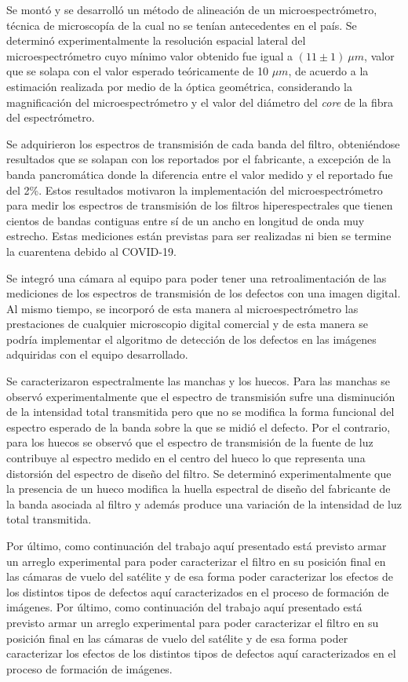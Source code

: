 Se montó y se desarrolló un método de alineación de un microespectrómetro, técnica de microscopía de la cual no se tenían antecedentes en el país. Se determinó experimentalmente la resolución espacial lateral del microespectrómetro cuyo mínimo valor obtenido fue igual a $(11 \pm 1)~\mu m$, valor que se solapa con el valor esperado teóricamente de 10 $\mu m$, de acuerdo a la estimación realizada por medio de la óptica geométrica, considerando la magnificación del microespectrómetro y el valor del diámetro del \textit{core} de la fibra del espectrómetro.

Se adquirieron los espectros de transmisión de cada banda del filtro, obteniéndose resultados que se solapan con los reportados por el fabricante, a excepción de la banda pancromática donde la diferencia entre el valor medido y el reportado fue del 2\%. Estos resultados motivaron la implementación del microespectrómetro para medir los espectros de transmisión de los filtros hiperespectrales que tienen cientos de bandas contiguas entre sí de un ancho en longitud de onda muy estrecho. Estas mediciones están previstas para ser realizadas ni bien se termine la cuarentena debido al COVID-19.

Se integró una cámara al equipo para poder tener una retroalimentación de las mediciones de los espectros de transmisión de los defectos con una imagen digital. Al mismo tiempo, se incorporó de esta manera al microespectrómetro las prestaciones de cualquier microscopio digital comercial y de esta manera se podría implementar el algoritmo de detección de los defectos en las imágenes adquiridas con el equipo desarrollado.

Se caracterizaron espectralmente las manchas y los huecos. Para las manchas se observó experimentalmente que el espectro de transmisión sufre una disminución de la intensidad total transmitida pero que no se modifica la forma funcional del espectro esperado de la banda sobre la que se midió el defecto. Por el contrario, para los huecos se observó que el espectro de transmisión de la fuente de luz contribuye al espectro medido en el centro del hueco lo que representa una distorsión del espectro de diseño del filtro. Se determinó experimentalmente que la presencia de un hueco modifica la huella espectral de diseño del fabricante de la banda asociada al filtro y además produce una variación de la intensidad de luz total transmitida. 

Por último, como continuación del trabajo aquí presentado está previsto armar un arreglo experimental para poder caracterizar el filtro en su posición final en las cámaras de vuelo del satélite y de esa forma poder caracterizar los efectos de los distintos tipos de defectos aquí caracterizados en el proceso de formación de imágenes.
Por último, como continuación del trabajo aquí presentado está previsto armar un arreglo experimental para poder caracterizar el filtro en su posición final en las cámaras de vuelo del satélite y de esa forma poder caracterizar los efectos de los distintos tipos de defectos aquí caracterizados en el proceso de formación de imágenes.